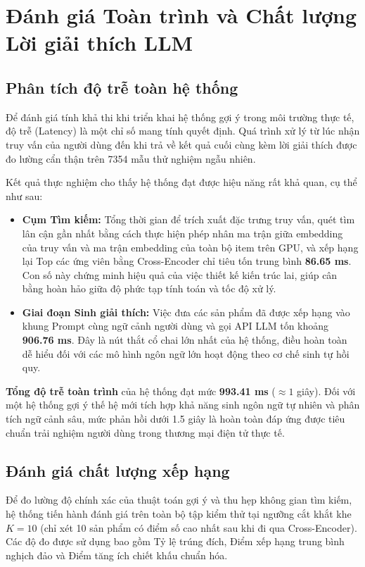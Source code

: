 \section{Đánh giá Toàn trình và Chất lượng Lời giải thích LLM}

\subsection{Phân tích độ trễ toàn hệ thống}
Để đánh giá tính khả thi khi triển khai hệ thống gợi ý trong môi trường thực tế, độ trễ (Latency) là một chỉ số mang tính quyết định. Quá trình xử lý từ lúc nhận truy vấn của người dùng đến khi trả về kết quả cuối cùng kèm lời giải thích được đo lường cẩn thận trên 7354 mẫu thử nghiệm ngẫu nhiên.

Kết quả thực nghiệm cho thấy hệ thống đạt được hiệu năng rất khả quan, cụ thể như sau:
\begin{itemize}
    \item \textbf{Cụm Tìm kiếm:} Tổng thời gian để trích xuất đặc trưng truy vấn, quét tìm lân cận gần nhất bằng cách thực hiện phép nhân ma trận giữa embedding của truy vấn và ma trận embedding của toàn bộ item trên GPU, và xếp hạng lại Top các ứng viên bằng Cross-Encoder chỉ tiêu tốn trung bình \textbf{86.65 ms}. Con số này chứng minh hiệu quả của việc thiết kế kiến trúc lai, giúp cân bằng hoàn hảo giữa độ phức tạp tính toán và tốc độ xử lý.
    \item \textbf{Giai đoạn Sinh giải thích:} Việc đưa các sản phẩm đã được xếp hạng vào khung Prompt cùng ngữ cảnh người dùng và gọi API LLM tốn khoảng \textbf{906.76 ms}. Đây là nút thắt cổ chai lớn nhất của hệ thống, điều hoàn toàn dễ hiểu đối với các mô hình ngôn ngữ lớn hoạt động theo cơ chế sinh tự hồi quy.
\end{itemize}

\textbf{Tổng độ trễ toàn trình} của hệ thống đạt mức \textbf{993.41 ms} ($\approx 1$ giây). Đối với một hệ thống gợi ý thế hệ mới tích hợp khả năng sinh ngôn ngữ tự nhiên và phân tích ngữ cảnh sâu, mức phản hồi dưới 1.5 giây là hoàn toàn đáp ứng được tiêu chuẩn trải nghiệm người dùng trong thương mại điện tử thực tế.

\subsection{Đánh giá chất lượng xếp hạng}
Để đo lường độ chính xác của thuật toán gợi ý và thu hẹp không gian tìm kiếm, hệ thống tiến hành đánh giá trên toàn bộ tập kiểm thử tại ngưỡng cắt khắt khe $K=10$ (chỉ xét 10 sản phẩm có điểm số cao nhất sau khi đi qua Cross-Encoder). Các độ đo được sử dụng bao gồm Tỷ lệ trúng đích, Điểm xếp hạng trung bình nghịch đảo và Điểm tăng ích chiết khấu chuẩn hóa.

